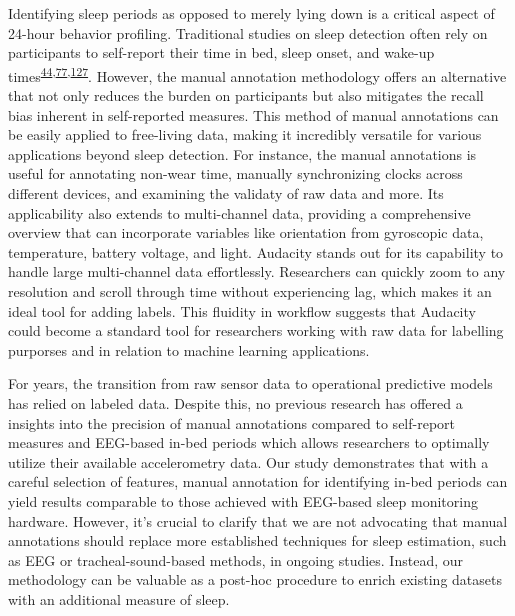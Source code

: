 \documentclass[
  10pt,
]{scrbook}
\begin{document}
Identifying sleep periods as opposed to merely lying down is a critical
aspect of 24-hour behavior profiling. Traditional studies on sleep
detection often rely on participants to self-report their time in bed,
sleep onset, and wake-up
times\textsuperscript{\protect\hyperlink{ref-girschik_validation_2012}{44},\protect\hyperlink{ref-littner_2003}{77},\protect\hyperlink{ref-lockley_1999}{127}}.
However, the manual annotation methodology offers an alternative that
not only reduces the burden on participants but also mitigates the
recall bias inherent in self-reported measures. This method of manual
annotations can be easily applied to free-living data, making it
incredibly versatile for various applications beyond sleep detection.
For instance, the manual annotations is useful for annotating non-wear
time, manually synchronizing clocks across different devices, and
examining the validaty of raw data and more. Its applicability also
extends to multi-channel data, providing a comprehensive overview that
can incorporate variables like orientation from gyroscopic data,
temperature, battery voltage, and light. Audacity stands out for its
capability to handle large multi-channel data effortlessly. Researchers
can quickly zoom to any resolution and scroll through time without
experiencing lag, which makes it an ideal tool for adding labels. This
fluidity in workflow suggests that Audacity could become a standard tool
for researchers working with raw data for labelling purporses and in
relation to machine learning applications.

For years, the transition from raw sensor data to operational predictive
models has relied on labeled data. Despite this, no previous research
has offered a insights into the precision of manual annotations compared
to self-report measures and EEG-based in-bed periods which allows
researchers to optimally utilize their available accelerometry data. Our
study demonstrates that with a careful selection of features, manual
annotation for identifying in-bed periods can yield results comparable
to those achieved with EEG-based sleep monitoring hardware. However,
it's crucial to clarify that we are not advocating that manual
annotations should replace more established techniques for sleep
estimation, such as EEG or tracheal-sound-based methods, in ongoing
studies. Instead, our methodology can be valuable as a post-hoc
procedure to enrich existing datasets with an additional measure of
sleep.
\end{document}

